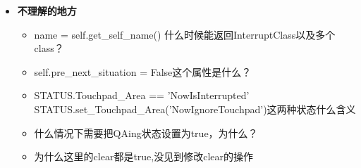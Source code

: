 \documentclass[]{article}
\begin{document}
\begin{itemize}
	\item \textbf{\textcolor{mycolor}{不理解的地方}}
	\begin{itemize}
		\item name = self.get\_self\_name() 什么时候能返回InterruptClass以及多个class？
		\item self.pre\_next\_situation = False这个属性是什么？
		\item STATUS.Touchpad\_Area == 'NowIsInterrupted'
\\		STATUS.set\_Touchpad\_Area('NowIgnoreTouchpad')这两种状态什么含义
		\item 什么情况下需要把QAing状态设置为true，为什么？
		\item 为什么这里的clear都是true,没见到修改clear的操作
	\end{itemize}
\end{itemize}
\end{document}
